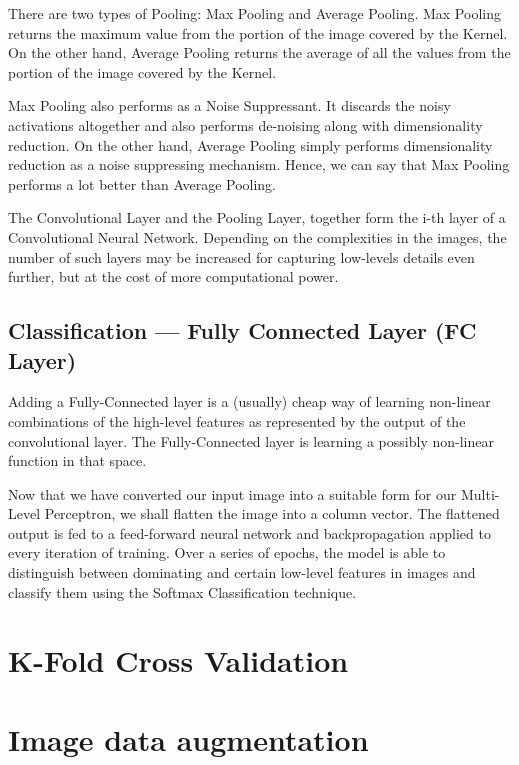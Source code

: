 There are two types of Pooling: Max Pooling and Average Pooling. Max Pooling returns the maximum value from the portion of the image covered by the Kernel. On the other hand, Average Pooling returns the average of all the values from the portion of the image covered by the Kernel.

Max Pooling also performs as a Noise Suppressant. It discards the noisy activations altogether and also performs de-noising along with dimensionality reduction. On the other hand, Average Pooling simply performs dimensionality reduction as a noise suppressing mechanism. Hence, we can say that Max Pooling performs a lot better than Average Pooling.

The Convolutional Layer and the Pooling Layer, together form the i-th layer of a Convolutional Neural Network. Depending on the complexities in the images, the number of such layers may be increased for capturing low-levels details even further, but at the cost of more computational power.

\subsection{Classification — Fully Connected Layer (FC Layer)}

Adding a Fully-Connected layer is a (usually) cheap way of learning non-linear combinations of the high-level features as represented by the output of the convolutional layer. The Fully-Connected layer is learning a possibly non-linear function in that space.

Now that we have converted our input image into a suitable form for our Multi-Level Perceptron, we shall flatten the image into a column vector. The flattened output is fed to a feed-forward neural network and backpropagation applied to every iteration of training. Over a series of epochs, the model is able to distinguish between dominating and certain low-level features in images and classify them using the Softmax Classification technique.

\section{K-Fold Cross Validation}
\section{Image data augmentation}



